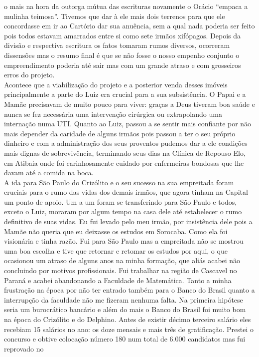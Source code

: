 \documentclass[12pt,brazil,]{book}
\begin{document}
o mais na hora da outorga mútua das escrituras novamente o Orácio
``empaca a mulinha teimosa''. Tivemos que dar à ele mais dois terrenos
para que ele concordasse em ir ao Cartório dar sua anuência, sem a qual
nada poderia ser feito pois todos estavam amarrados entre si como sete
irmãos xifópagos. Depois da divisão e respectiva escritura os fatos
tomaram rumos diversos, ocorreram dissensões mas o resumo final é que se
não fosse o nosso empenho conjunto o empreendimento poderia até sair mas
com um grande atraso e com grosseiros erros do projeto.\\
Acontece que a viabilização do projeto e a posterior venda desses
imóveis principalmente a parte do Luiz era crucial para a sua
subsistência. O Papai e a Mamãe precisavam de muito pouco para viver:
graças a Deus tiveram boa saúde e nunca se fez necessária uma
intervenção cirúrgica ou extrapolando uma internação numa UTI. Quanto ao
Luiz, passou a se sentir mais confiante por não mais depender da
caridade de alguns irmãos pois passou a ter o seu próprio dinheiro e com
a administração dos seus proventos pudemos dar a ele condições mais
dignas de sobrevivência, terminando seus dias na Clínica de Repouso Elo,
em Atibaia onde foi carinhosamente cuidado por enfermeiras bondosas que
lhe davam até a comida na boca.\\
A ida para São Paulo do Crizólito e o seu sucesso na sua empreitada
foram cruciais para o rumo das vidas dos demais irmãos, que agora tinham
na Capital um ponto de apoio. Um a um foram se transferindo para São
Paulo e todos, exceto o Luiz, moraram por algum tempo na casa dele até
estabelecer o rumo definitivo de suas vidas. Eu fui levado pelo meu
irmão, por insistência dele pois a Mamãe não queria que eu deixasse os
estudos em Sorocaba. Como ela foi visionária e tinha razão. Fui para São
Paulo mas a empreitada não se mostrou uma boa escolha e tive que
retornar e retomar os estudos por aqui, o que ocasionou um atraso de
alguns anos na minha formação, que aliás acabei não concluindo por
motivos profissionais. Fui trabalhar na região de Cascavel no Paraná e
acabei abandonando a Faculdade de Matemática. Tanto a minha frustração
na época por não ter entrado também para o Banco do Brasil quanto a
interrupção da faculdade não me fizeram nenhuma falta. Na primeira
hipótese seria um burocrático bancário e além do mais o Banco do Brasil
foi muito bom na época do Crizólito e do Delphino. Antes de existir
décimo terceiro salário eles recebiam 15 salários no ano: os doze
mensais e mais três de gratificação. Prestei o concurso e obtive
colocação número 180 num total de 6.000 candidatos mas fui reprovado no
\end{document}
